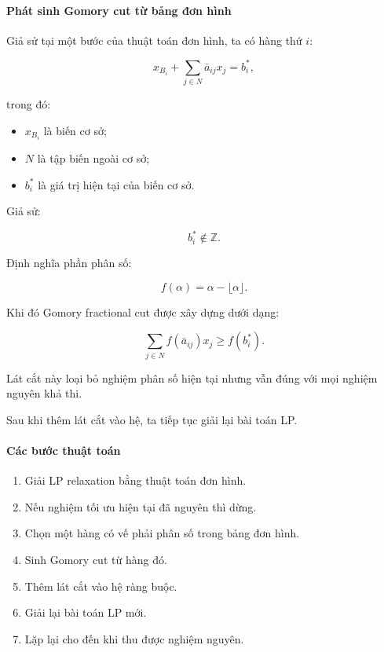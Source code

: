 \documentclass[fontsize=13pt,a4paper]{report}
\begin{document}
\paragraph{Phát sinh Gomory cut từ bảng đơn hình}

Giả sử tại một bước của thuật toán đơn hình, ta có hàng thứ \(i\):

\[
x_{B_i}+\sum_{j\in N}\bar a_{ij}x_j=b_i^*,
\]

trong đó:

\begin{itemize}
    \item \(x_{B_i}\) là biến cơ sở;
    \item \(N\) là tập biến ngoài cơ sở;
    \item \(b_i^*\) là giá trị hiện tại của biến cơ sở.
\end{itemize}

Giả sử:

\[
b_i^*\notin\mathbb{Z}.
\]

Định nghĩa phần phân số:

\[
f(\alpha)=\alpha-\lfloor\alpha\rfloor.
\]

Khi đó Gomory fractional cut được xây dựng dưới dạng:

\[
\sum_{j\in N} f(\bar a_{ij})x_j \ge f(b_i^*).
\]

Lát cắt này loại bỏ nghiệm phân số hiện tại nhưng vẫn đúng với mọi nghiệm nguyên khả thi.

Sau khi thêm lát cắt vào hệ, ta tiếp tục giải lại bài toán LP.

\paragraph{Các bước thuật toán}

\begin{enumerate}

  \item Giải LP relaxation bằng thuật toán đơn hình.

  \item Nếu nghiệm tối ưu hiện tại đã nguyên thì dừng.

  \item Chọn một hàng có vế phải phân số trong bảng đơn hình.

  \item Sinh Gomory cut từ hàng đó.

  \item Thêm lát cắt vào hệ ràng buộc.

  \item Giải lại bài toán LP mới.

  \item Lặp lại cho đến khi thu được nghiệm nguyên.

\end{enumerate}
\end{document}
